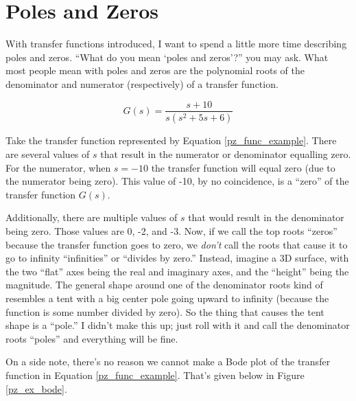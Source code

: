 \section{Poles and Zeros} %

With transfer functions introduced, I want to spend a little more time describing poles and zeros. ``What do you mean `poles and zeros'?'' you may ask. What most people mean with poles and zeros are the polynomial roots of the denominator and numerator (respectively) of a transfer function.

\begin{equation}
G(s) = \frac{s+10}{s(s^2+5s+6)}
\label{pz_func_example}
\end{equation}

Take the transfer function represented by Equation \ref{pz_func_example}. There are several values of $s$ that result in the numerator or denominator equalling zero. For the numerator, when $s = -10$ the transfer function will equal zero (due to the numerator being zero). This value of -10, by no coincidence, is a ``zero'' of the transfer function $G(s)$.

Additionally, there are multiple values of $s$ that would result in the denominator being zero. Those values are 0, -2, and -3. Now, if we call the top roots ``zeros'' because the transfer function goes to zero, we \emph{don't} call the roots that cause it to go to infinity ``infinities'' or ``divides by zero.'' Instead, imagine a 3D surface, with the two ``flat'' axes being the real and imaginary axes, and the ``height'' being the magnitude. The general shape around one of the denominator roots kind of resembles a tent with a big center pole going upward to infinity (because the function is some number divided by zero). So the thing that causes the tent shape is a ``pole.'' I didn't make this up; just roll with it and call the denominator roots ``poles'' and everything will be fine.

On a side note, there's no reason we cannot make a Bode plot of the transfer function in Equation \ref{pz_func_example}. That's given below in Figure \ref{pz_ex_bode}.

